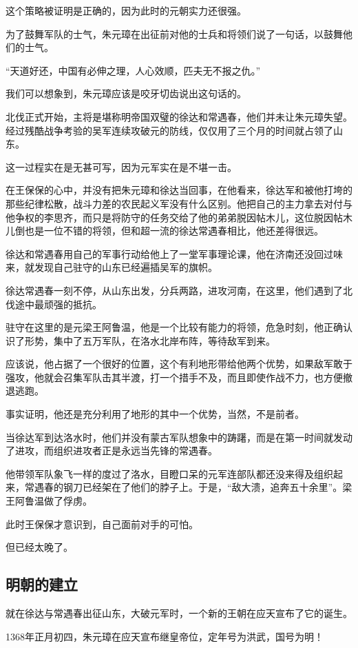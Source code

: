 \begin{multicols}{\theparacolNo}
		这个策略被证明是正确的，因为此时的元朝实力还很强。

		为了鼓舞军队的士气，朱元璋在出征前对他的士兵和将领们说了一句话，以鼓舞他们的士气。

		“天道好还，中国有必伸之理，人心效顺，匹夫无不报之仇。”

		我们可以想象到，朱元璋应该是咬牙切齿说出这句话的。

		北伐正式开始，主将是堪称明帝国双璧的徐达和常遇春，他们并未让朱元璋失望。经过残酷战争考验的吴军连续攻破元的防线，仅仅用了三个月的时间就占领了山东。

		这一过程实在是无甚可写，因为元军实在是不堪一击。

		在王保保的心中，并没有把朱元璋和徐达当回事，在他看来，徐达军和被他打垮的那些纪律松散，战斗力差的农民起义军没有什么区别。他把自己的主力拿去对付与他争权的李思齐，而只是将防守的任务交给了他的弟弟脱因帖木儿，这位脱因帖木儿倒也是一位不错的将领，但和超一流的徐达常遇春相比，他还差得很远。

		徐达和常遇春用自己的军事行动给他上了一堂军事理论课，他在济南还没回过味来，就发现自己驻守的山东已经遍插吴军的旗帜。

		徐达常遇春一刻不停，从山东出发，分兵两路，进攻河南，在这里，他们遇到了北伐途中最顽强的抵抗。

		驻守在这里的是元梁王阿鲁温，他是一个比较有能力的将领，危急时刻，他正确认识了形势，集中了五万军队，在洛水北岸布阵，等待敌军到来。

		应该说，他占据了一个很好的位置，这个有利地形带给他两个优势，如果敌军敢于强攻，他就会召集军队击其半渡，打一个措手不及，而且即使作战不力，也方便撤退逃跑。

		事实证明，他还是充分利用了地形的其中一个优势，当然，不是前者。

		当徐达军到达洛水时，他们并没有蒙古军队想象中的踌躇，而是在第一时间就发动了进攻，而组织进攻者正是永远当先锋的常遇春。

		他带领军队象飞一样的度过了洛水，目瞪口呆的元军连部队都还没来得及组织起来，常遇春的钢刀已经架在了他们的脖子上。于是，“敌大溃，追奔五十余里”。梁王阿鲁温做了俘虏。

		此时王保保才意识到，自己面前对手的可怕。

		但已经太晚了。

		\subsection{明朝的建立}
		就在徐达与常遇春出征山东，大破元军时，一个新的王朝在应天宣布了它的诞生。

		1368年正月初四，朱元璋在应天宣布继皇帝位，定年号为洪武，国号为明！


\end{multicols}
